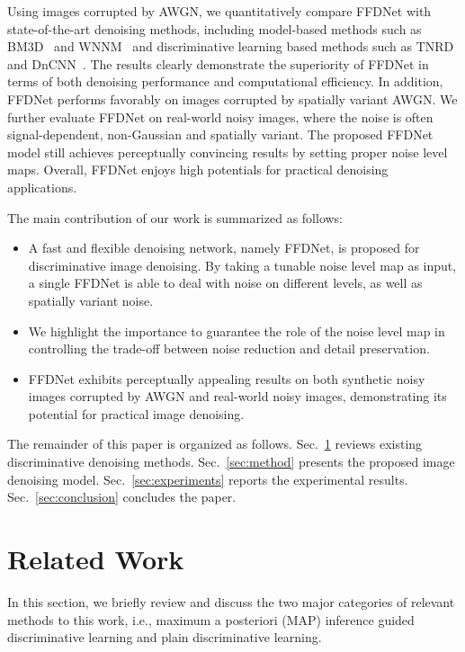 \documentclass[journal]{IEEEtran}
\begin{document}
Using images corrupted by AWGN, we quantitatively compare FFDNet with state-of-the-art denoising methods, including model-based methods such as BM3D~\cite{dabov2007image} and WNNM~\cite{gu2014weighted} and discriminative learning based methods such as TNRD~\cite{chen2015trainable} and DnCNN~\cite{zhang2017beyond}.
The results clearly demonstrate the superiority of FFDNet in terms of both denoising performance and computational efficiency. In addition, FFDNet performs favorably on images corrupted by spatially variant AWGN. We further evaluate FFDNet on real-world noisy images, where the noise is often signal-dependent, non-Gaussian and spatially variant. The proposed FFDNet model still achieves perceptually convincing results by setting proper noise level maps. Overall, FFDNet enjoys high potentials for practical denoising applications.


The main contribution of our work is summarized as follows:
\begin{itemize}

\item A fast and flexible denoising network, namely FFDNet, is proposed for discriminative image denoising. By taking a tunable noise level map as input, a single FFDNet is able to deal with noise on different levels, as well as spatially variant noise.

\item We highlight the importance to guarantee the role of the noise level map in controlling the trade-off between noise reduction and detail preservation.

\item FFDNet exhibits perceptually appealing results on both synthetic noisy images corrupted by AWGN and real-world noisy images, demonstrating its potential for practical image denoising.

\end{itemize}


The remainder of this paper is organized as follows.
Sec.~\ref{sec:related_work} reviews existing discriminative denoising methods.
Sec.~\ref{sec:method} presents the proposed image denoising model.
Sec.~\ref{sec:experiments} reports the experimental results.
Sec.~\ref{sec:conclusion} concludes the paper.


\section{Related Work}
\label{sec:related_work}

In this section, we briefly review and discuss the two major categories of relevant methods to this work, i.e., maximum a posteriori (MAP) inference guided discriminative learning and plain discriminative learning.
\end{document}

